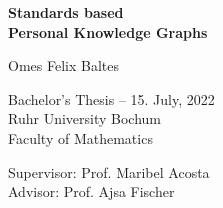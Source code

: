 \begin{titlepage}
    \begin{center}
        \vspace*{1cm}
        \Huge
        \textbf{Standards based \\Personal Knowledge Graphs}\\
        
        \vspace*{1cm}
        
        \huge
        Omes Felix Baltes
      
        \vfill
        
        \large
        Bachelor's Thesis -- 15. July, 2022\\
        
        Ruhr University Bochum\\
        Faculty of Mathematics\\
        
        \vspace{1cm}
        
        
        Supervisor: Prof. Maribel Acosta\\
        Advisor: Prof. Ajsa Fischer\\
 
    \end{center}
\end{titlepage}